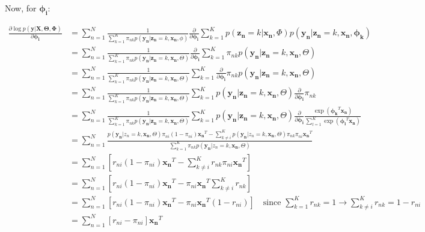 \documentclass[12pt,a4paper,oneside]{paper}
\begin{document}
Now, for $\bm{\phi_i}$:

\begin{align*}
    \frac{\partial \log p(\bm{y} | \bm{X}, \bm{\Theta}, \bm{\Phi})}{\partial \bm{\phi_i}} &= \sum_{n=1}^{N} \frac{1}{\sum_{k=1}^{K} \pi_{nk} p(\bm{y_n} | \bm{z_n} = k, \bm{x_n}, \phi)} \frac{\partial}{\partial \bm{\phi_i}} \sum_{k=1}^{K} p(\bm{z_n} = k | \bm{x_n}, \Phi) p(\bm{y_n} | \bm{z_n} = k, \bm{x_n}, \bm{\phi_k}) \\
    &= \sum_{n=1}^{N} \frac{1}{\sum_{k=1}^{K} \pi_{nk} p(\bm{y_n} | \bm{z_n} = k, \bm{x_n}, \Theta)} \frac{\partial}{\partial \bm{\phi_i}} \sum_{k=1}^{K} \pi_{nk} p(\bm{y_n} | \bm{z_n} = k, \bm{x_n}, \Theta) \\
    &= \sum_{n=1}^{N} \frac{1}{\sum_{k=1}^{K} \pi_{nk} p(\bm{y_n} | \bm{z_n} = k, \bm{x_n}, \Theta)}  \sum_{k=1}^{K} \frac{\partial}{\partial \bm{\phi_i}} \pi_{nk} p(\bm{y_n} | \bm{z_n} = k, \bm{x_n}, \Theta) \\
    &= \sum_{n=1}^{N} \frac{1}{\sum_{k=1}^{K} \pi_{nk} p(\bm{y_n} | \bm{z_n} = k, \bm{x_n}, \Theta)}  \sum_{k=1}^{K} p(\bm{y_n} | \bm{z_n} = k, \bm{x_n}, \Theta) \frac{\partial}{\partial \bm{\phi_i}} \pi_{nk}  \\
    &= \sum_{n=1}^{N} \frac{1}{\sum_{k=1}^{K} \pi_{nk} p(\bm{y_n} | \bm{z_n} = k, \bm{x_n}, \Theta)}  \sum_{k=1}^{K} p(\bm{y_n} | \bm{z_n} = k, \bm{x_n}, \Theta) \frac{\partial}{\partial \bm{\phi_i}} \frac{\exp(\bm{\phi_k}^T \bm{x_n})}{\sum_{l=1}^{K} \exp(\bm{\phi_l}^T \bm{x_n})}  \\
    &= \sum_{n=1}^{N} \frac{p(\bm{y_n} | z_n = k, \bm{x_n}, \Theta) \pi_{ni} (1 - \pi_{ni}) \bm{x_n}^T - \sum_{k \neq i}^{K} p(\bm{y_n} | z_n = k, \bm{x_n}, \Theta) \pi_{nk} \pi_{ni} \bm{x_n}^T}{\sum_{k=1}^{K} \pi_{nk} p(\bm{y_n} | z_n = k, \bm{x_n}, \Theta)}   \\
    &= \sum_{n=1}^{N} \left[r_{ni} (1 - \pi_{ni}) \bm{x_n}^T - \sum_{k \neq i}^{K} r_{nk} \pi_{ni} \bm{x_n}^T \right] \\
    &= \sum_{n=1}^{N} \left[r_{ni} (1 - \pi_{ni}) \bm{x_n}^T - \pi_{ni} \bm{x_n}^T \sum_{k \neq i}^{K} r_{nk}\right]  \\
    &= \sum_{n=1}^{N} \left[r_{ni} (1 - \pi_{ni}) \bm{x_n}^T - \pi_{ni} \bm{x_n}^T (1 - r_{ni})\right] \quad \text{since $\sum_{k=1}^{K} r_{nk} = 1 \rightarrow \sum_{k \neq i}^{K} r_{nk} = 1 - r_{ni}$} \\
    &= \sum_{n=1}^{N} \left[r_{ni} - \pi_{ni}\right] \bm{x_n}^T
\end{align*}

\newpage
\end{document}
